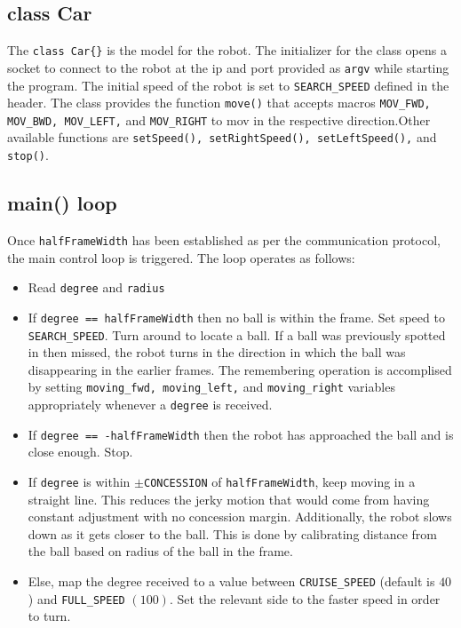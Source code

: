 \documentclass[12pt, twoside, a4paper, titlepage]{article}
\begin{document}
\subsection{class Car}
The \texttt{class Car\{\}} is the model for the robot. The initializer for the class opens a socket to connect to the robot at the ip and port provided as \texttt{argv} while starting the program. The initial speed of the robot is set to \texttt{SEARCH\_SPEED} defined in the header. The class provides the function \texttt{move()} that accepts macros \texttt{MOV\_FWD, MOV\_BWD, MOV\_LEFT,} and \texttt{MOV\_RIGHT} to mov in the respective direction.Other available functions are \texttt{setSpeed(), setRightSpeed(), setLeftSpeed(),} and \texttt{stop()}.
\subsection{main() loop}
Once \texttt{halfFrameWidth} has been established as per the communication protocol, the main control loop is triggered. The loop operates as follows:
\begin{itemize}
\item Read \texttt{degree} and \texttt{radius}
\item If \texttt{degree == halfFrameWidth} then no ball is within the frame. Set speed to \texttt{SEARCH\_SPEED}. Turn around to locate a ball. If a ball was previously spotted in then missed, the robot turns in the direction in which the ball was disappearing in the earlier frames. The remembering operation is accomplised by setting \texttt{moving\_fwd, moving\_left,} and \texttt{moving\_right} variables appropriately whenever a \texttt{degree} is received.
\item If \texttt{degree == -halfFrameWidth} then the robot has approached the ball and is close enough. Stop.
\item If \texttt{degree} is within $\pm$\texttt{CONCESSION} of \texttt{halfFrameWidth}, keep moving in a straight line. This reduces the jerky motion that would come from having constant adjustment with no concession margin. Additionally, the robot slows down as it gets closer to the ball. This is done by calibrating distance from the ball based on radius of the ball in the frame.
\item Else, map the degree received to a value between \texttt{CRUISE\_SPEED} (default is $40$) and \texttt{FULL\_SPEED} $(100)$. Set the relevant side to the faster speed in order to turn.
\end{itemize}
\end{document}
